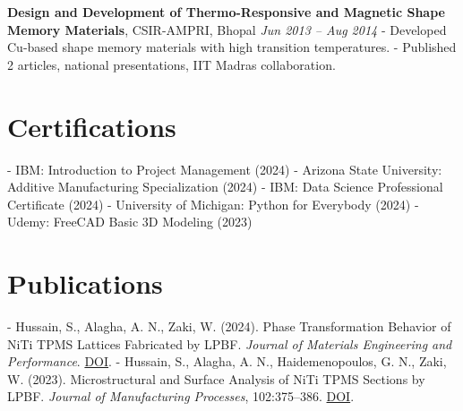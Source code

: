 \documentclass[11pt,a4paper]{article}
\begin{document}
\textbf{Design and Development of Thermo-Responsive and Magnetic Shape Memory Materials}, CSIR-AMPRI, Bhopal \hfill \textit{Jun 2013 -- Aug 2014}  
- Developed Cu-based shape memory materials with high transition temperatures.  
- Published 2 articles, national presentations, IIT Madras collaboration.  

\section*{Certifications}
- IBM: Introduction to Project Management (2024)  
- Arizona State University: Additive Manufacturing Specialization (2024)  
- IBM: Data Science Professional Certificate (2024)  
- University of Michigan: Python for Everybody (2024)  
- Udemy: FreeCAD Basic 3D Modeling (2023)  

\section*{Publications}
- Hussain, S., Alagha, A. N., Zaki, W. (2024). Phase Transformation Behavior of NiTi TPMS Lattices Fabricated by LPBF. \textit{Journal of Materials Engineering and Performance}. \href{https://doi.org/10.1007/s11665-024-09162-7}{DOI}.  
- Hussain, S., Alagha, A. N., Haidemenopoulos, G. N., Zaki, W. (2023). Microstructural and Surface Analysis of NiTi TPMS Sections by LPBF. \textit{Journal of Manufacturing Processes}, 102:375–386. \href{https://doi.org/10.1016/j.jmapro.2023.07.055}{DOI}.  
\end{document}
